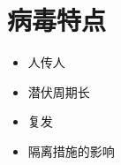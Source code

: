 \section{病毒特点}
\begin{itemize}
    \item 人传人
    \item 潜伏周期长
    \item 复发
    \item 隔离措施的影响
\end{itemize}


